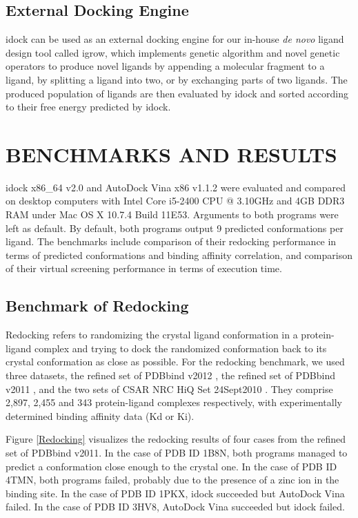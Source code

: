 \documentclass[12pt]{article}
\begin{document}
\subsection*{\sffamily \large External Docking Engine}

idock can be used as an external docking engine for our in-house \textit{de novo} ligand design tool called igrow, which implements genetic algorithm and novel genetic operators to produce novel ligands by appending a molecular fragment to a ligand, by splitting a ligand into two, or by exchanging parts of two ligands. The produced population of ligands are then evaluated by idock and sorted according to their free energy predicted by idock.

\section*{\sffamily \Large BENCHMARKS AND RESULTS}

idock x86\_64 v2.0 and AutoDock Vina x86 v1.1.2 were evaluated and compared on desktop computers with Intel Core i5-2400 CPU @ 3.10GHz and 4GB DDR3 RAM under Mac OS X 10.7.4 Build 11E53. Arguments to both programs were left as default. By default, both programs output 9 predicted conformations per ligand. The benchmarks include comparison of their redocking performance in terms of predicted conformations and binding affinity correlation, and comparison of their virtual screening performance in terms of execution time.

\subsection*{\sffamily \large Benchmark of Redocking}

Redocking refers to randomizing the crystal ligand conformation in a protein-ligand complex and trying to dock the randomized conformation back to its crystal conformation as close as possible. For the redocking benchmark, we used three datasets, the refined set of PDBbind v2012 \citep{529,530}, the refined set of PDBbind v2011 \citep{529,530}, and the two sets of CSAR NRC HiQ Set 24Sept2010 \citep{857,960}. They comprise 2,897, 2,455 and 343 protein-ligand complexes respectively, with experimentally determined binding affinity data (Kd or Ki).

Figure \ref{Redocking} visualizes the redocking results of four cases from the refined set of PDBbind v2011. In the case of PDB ID 1B8N, both programs managed to predict a conformation close enough to the crystal one. In the case of PDB ID 4TMN, both programs failed, probably due to the presence of a zinc ion in the binding site. In the case of PDB ID 1PKX, idock succeeded but AutoDock Vina failed. In the case of PDB ID 3HV8, AutoDock Vina succeeded but idock failed.
\end{document}
